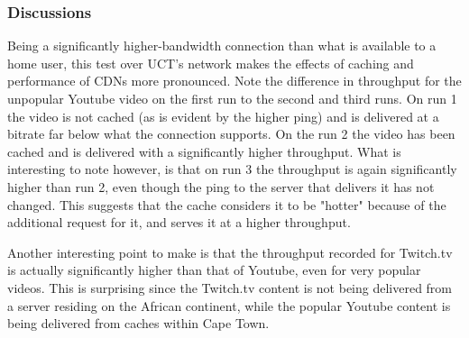 \documentclass{sig-alternate-05-2015}
\begin{document}
\begin{table}
	\centering
	\caption{Throughput using UCT network - Test 2}
	\label{table:UCTThroughput-TestCase2}
\end{table}

\subsubsection{Discussions}
Being a significantly higher-bandwidth connection than what is available to a home user, this test over UCT's network makes the effects of caching and performance of CDNs more pronounced. Note the difference in throughput for the unpopular Youtube video on the first run to the second and third runs. On run 1 the video is not cached (as is evident by the higher ping) and is delivered at a bitrate far below what the connection supports. On the run 2 the video has been cached and is delivered with a significantly higher throughput. What is interesting to note however, is that on run 3 the throughput is again significantly higher than run 2, even though the ping to the server that delivers it has not changed. This suggests that the cache considers it to be "hotter" because of the additional request for it, and serves it at a higher throughput.

Another interesting point to make is that the throughput recorded for Twitch.tv is actually significantly higher than that of Youtube, even for very popular videos. This is surprising since the Twitch.tv content is not being delivered from a server residing on the African continent, while the popular Youtube content is being delivered from caches within Cape Town.
\end{document}
